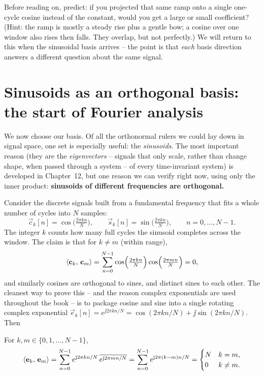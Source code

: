 \begin{walkbox}
Before reading on, predict: if you projected that same ramp onto a single one-cycle cosine instead of
the constant, would you get a large or small coefficient? (Hint: the ramp is mostly a steady rise
plus a gentle bow; a cosine over one window also rises then falls. They overlap, but not perfectly.)
We will return to this when the sinusoidal basis arrives -- the point is that \emph{each} basis
direction answers a different question about the same signal.
\end{walkbox}

\section{Sinusoids as an orthogonal basis: the start of Fourier analysis}
\label{ch03:sinusoid-basis}

We now choose our basis. Of all the orthonormal rulers we could lay down in signal space, one set is
especially useful: the \emph{sinusoids}. The most important reason (they are the \emph{eigenvectors} -- signals that only scale, rather than change shape, when passed through a system -- of every
time-invariant system) is developed in Chapter~12, but one reason we can verify right now,
using only the inner product: \textbf{sinusoids of different frequencies are orthogonal.}

Consider the discrete signals built from a fundamental frequency that fits a whole number of cycles
into $N$ samples:
\[
  \vec{c}_k[n] = \cos\!\Big(\tfrac{2\pi k n}{N}\Big), \qquad
  \vec{s}_k[n] = \sin\!\Big(\tfrac{2\pi k n}{N}\Big), \qquad n=0,\dots,N-1 .
\]
The integer $k$ counts how many full cycles the sinusoid completes across the window. The claim is
that for $k\neq m$ (within range),
\[
  \langle \mathbf{c}_k,\, \mathbf{c}_m \rangle = \sum_{n=0}^{N-1}
  \cos\!\Big(\tfrac{2\pi k n}{N}\Big)\cos\!\Big(\tfrac{2\pi m n}{N}\Big) = 0 ,
\]
and similarly cosines are orthogonal to sines, and distinct sines to each other. The cleanest way to
prove this -- and the reason complex exponentials are used throughout the book -- is to package
cosine and sine into a single rotating complex exponential
$\vec{e}_k[n]=e^{\jj 2\pi k n/N} = \cos(2\pi kn/N) + \jj\sin(2\pi kn/N)$. Then

\begin{theorem}
\label{ch03:thm-dft-ortho}
For $k,m \in \{0,1,\dots,N-1\}$,
\[
  \langle \mathbf{e}_k,\, \mathbf{e}_m \rangle
  = \sum_{n=0}^{N-1} e^{\mathrm{j} 2\pi k n/N}\, \overline{e^{\mathrm{j} 2\pi m n/N}}
  = \sum_{n=0}^{N-1} e^{\mathrm{j} 2\pi (k-m) n/N}
  = \begin{cases} N & k=m,\\ 0 & k\neq m. \end{cases}
\]
\end{theorem}

